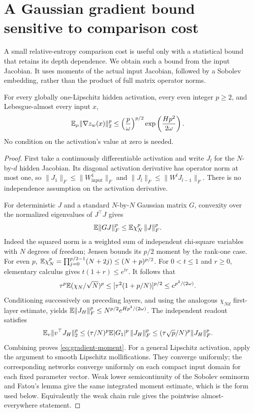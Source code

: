 \section{A Gaussian gradient bound sensitive to comparison cost}
\label{sec:sobolev-depth}
A small relative-entropy comparison cost is useful only with a statistical bound that retains its depth dependence. We obtain such a bound from the input Jacobian. It uses moments of the actual input Jacobian, followed by a Sobolev embedding, rather than the product of full matrix operator norms.

\begin{lemma}
\label{lem:gaussian-gradient}
For every globally one-Lipschitz hidden activation, every even integer $p\ge2$, and Lebesgue-almost every input $x$,
\begin{equation}
 \mathbb E_\mu\|\nabla z_w(x)\|_2^p
 \le\left(\frac p\omega\right)^{p/2}
                     \exp\left(\frac{Hp^2}{2\omega}\right).
 \label{eq:gradient-moment}
\end{equation}
No condition on the activation's value at zero is needed.
\end{lemma}
\begin{proof}
First take a continuously differentiable activation and write $J_l$ for the $N$-by-$d$ hidden Jacobian. Its diagonal activation derivative has operator norm at most one, so
$\|J_1\|_F\le\|W^1_{\mathrm{input}}\|_F$ and
$\|J_l\|_F\le\|W^lJ_{l-1}\|_F$.
There is no independence assumption on the activation derivative.

For deterministic $J$ and a standard $N$-by-$N$ Gaussian matrix $G$, convexity over the normalized eigenvalues of $J^\top J$ gives
\[
 \mathbb E\|GJ\|_F^p\le\mathbb E\chi_N^p\,\|J\|_F^p.
\]
Indeed the squared norm is a weighted sum of independent chi-square variables with $N$ degrees of freedom; Jensen bounds its $p/2$ moment by the rank-one case. For even $p$,
$\mathbb E\chi_N^p=\prod_{j=0}^{p/2-1}(N+2j)\le(N+p)^{p/2}$.
For $0<t\le1$ and $r\ge0$, elementary calculus gives
$t(1+r)\le e^{tr}$.
It follows that
\[
 \tau^p\mathbb E(\chi_N/\sqrt N)^p
 \le[\tau^2(1+p/N)]^{p/2}
 \le e^{p^2/(2\omega)}.
\]
Conditioning successively on preceding layers, and using the analogous $\chi_{Nd}$ first-layer estimate, yields
$\mathbb E\|J_H\|_F^p\le N^{p/2}e^{Hp^2/(2\omega)}$.
The independent readout satisfies
\[
 \mathbb E_v\|v^\top J_H\|_2^p
 \le(\tau/N)^p\mathbb E|G_1|^p\,\|J_H\|_F^p
 \le(\tau\sqrt p/N)^p\|J_H\|_F^p.
\]
Combining proves \eqref{eq:gradient-moment}. For a general Lipschitz activation, apply the argument to smooth Lipschitz mollifications. They converge uniformly; the corresponding networks converge uniformly on each compact input domain for each fixed parameter vector. Weak lower semicontinuity of the Sobolev seminorm and Fatou's lemma give the same integrated moment estimate, which is the form used below. Equivalently the weak chain rule gives the pointwise almost-everywhere statement.
\end{proof}


